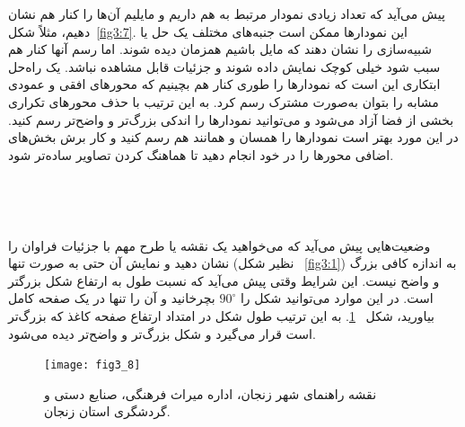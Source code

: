 پیش می‌آید که تعداد زیادی نمودار مرتبط به هم داریم و مایلیم آن‌ها را کنار هم نشان دهیم، مثلاً شکل~\ref{fig3:7}. این نمودارها ممکن است جنبه‌های مختلف یک حل یا شبیه‌سازی را نشان دهند که مایل باشیم همزمان دیده شوند. اما رسم آنها کنار هم سبب شود خیلی کوچک نمایش داده شوند و جزئیات قابل مشاهده نباشد. یک راه‌حل ابتکاری این است که نمودارها را طوری کنار هم بچینیم که محورهای افقی و عمودی مشابه را بتوان به‌صورت مشترک رسم کرد. به این ترتیب با حذف محورهای تکراری بخشی از فضا آزاد می‌شود و می‌توانید نمودارها را اندکی بزرگ‌تر و واضح‌تر رسم کنید. در این مورد بهتر است نمودارها را همسان و همانند هم رسم کنید و کار برش بخش‌های اضافی محورها را در خود 
\latex 
انجام دهید تا هماهنگ کردن تصاویر ساده‌تر شود.

\begin{figure}[!tbhp] %
  \begin{subfloatrow}[3]
    ~~~~~~~~~
  \end{subfloatrow}
  \begin{subfloatrow}[3]
    ~~~~~~~~~
  \end{subfloatrow}
\end{figure}

وضعیت‌هایی پیش می‌آید که می‌خواهید یک نقشه یا طرح مهم با جزئیات فراوان را نشان دهید و نمایش آن حتی به صورت تنها (نظیر شکل~%
\ref{fig3:1}) 
به اندازه کافی بزرگ و واضح نیست. این شرایط وقتی پیش می‌آید که نسبت طول به ارتفاع شکل بزرگتر است. در این موارد می‌توانید شکل را $90^\circ$ بچرخانید و آن را تنها در یک صفحه کامل بیاورید، شکل~%
\ref{fig3:8}. 
به این ترتیب طول شکل در امتداد ارتفاع صفحه کاغذ که بزرگ‌تر است قرار می‌گیرد و شکل بزرگ‌تر و واضح‌تر دیده می‌شود.

\begin{figure} %
\centering
\texttt{[image: fig3\_8]}
\caption[ %
نقشه راهنمای شهر زنجان]{ %
نقشه راهنمای شهر زنجان، اداره میراث فرهنگی، صنایع دستی و گردشگری استان زنجان.}
\label{fig3:8}
\end{figure}


